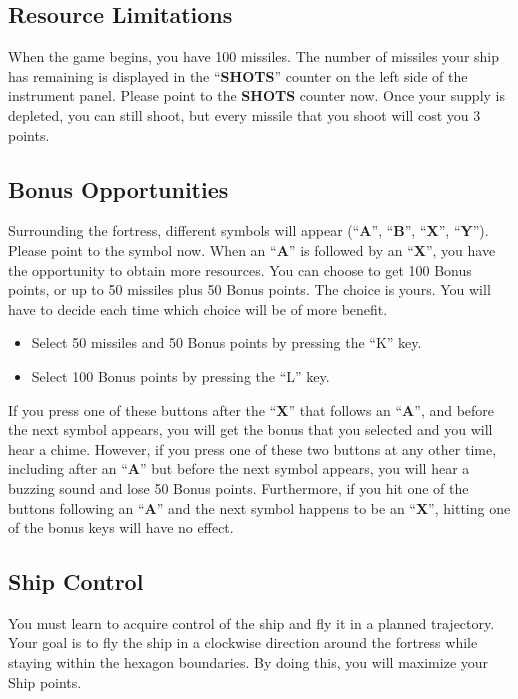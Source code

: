 \documentclass[letterpaper,12pt]{article}
\begin{document}
\subsection{Resource Limitations}

When the game begins, you have 100 missiles. The number of missiles your ship has
remaining is displayed in the ``\textbf{SHOTS}'' counter on the left side of the instrument panel.
Please point to the \textbf{SHOTS} counter now. Once your supply is depleted, you can still shoot,
but every missile that you shoot will cost you 3 points.

\subsection{Bonus Opportunities}

Surrounding the fortress, different symbols will appear (``\textbf{A}'', ``\textbf{B}'',
``\textbf{X}'', ``\textbf{Y}''). Please point to the symbol now. When an ``\textbf{A}'' is followed
by an ``\textbf{X}'', you have the opportunity to obtain more resources. You can choose to get 100
Bonus points, or up to 50 missiles plus 50 Bonus points. The choice is yours. You will have to
decide each time which choice will be of more benefit.
\begin{itemize}
\item Select 50 missiles and 50 Bonus points by pressing the ``K'' key.
\item Select 100 Bonus points by pressing the ``L'' key.
\end{itemize}
 
If you press one of these buttons after the ``\textbf{X}'' that follows an ``\textbf{A}'', and
before the next symbol appears, you will get the bonus that you selected and you will hear a chime.
However, if you press one of these two buttons at any other time, including after an ``\textbf{A}''
but before the next symbol appears, you will hear a buzzing sound and lose 50 Bonus points.
Furthermore, if you hit one of the buttons following an ``\textbf{A}'' and the next symbol happens
to be an ``\textbf{X}'', hitting one of the bonus keys will have no effect.

\subsection{Ship Control}

You must learn to acquire control of the ship and fly it in a planned trajectory. Your goal
is to fly the ship in a clockwise direction around the fortress while staying within the hexagon
boundaries. By doing this, you will maximize your Ship points.
\end{document}
